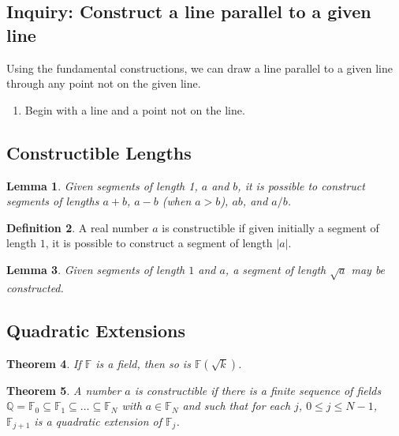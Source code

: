 \documentclass[11pt]{article}
\newenvironment{task}
	{\begin{mdframed}[linecolor=lightgray, linewidth=3pt]\raggedright}
	{\end{mdframed}}
\renewcommand\subset\subseteq
\newtheorem{theorem}{Theorem}[section]
\newtheorem{lemma}[theorem]{Lemma}
\theoremstyle{definition}
\newtheorem{definition}[theorem]{Definition}
\begin{document}
\subsection{Inquiry: Construct a line parallel to a given line}
\begin{task}
  Using the fundamental constructions, we can draw a line parallel to a given line through any point not on the given line.

  \begin{enumerate}
    \item Begin with a line and a point not on the line.
  \end{enumerate}
\end{task}

\subsection{Constructible Lengths}

\begin{lemma}
  Given segments of length 1, $a$ and $b$, it is possible to construct segments of lengths $a+b$, $a-b$ (when $a>b$), $ab$, and $a/b$.
  \label{lemma: rational constructions}
\end{lemma}

\begin{definition}
  A real number $a$ is constructible if given initially a segment of length $1$, it is possible to construct a segment of length $|a|$.
\end{definition}

\begin{lemma}
  Given segments of length $1$ and $a$, a segment of length $\sqrt{a}$ may be constructed.
  \label{lemma: sqrt can be constructed}
\end{lemma}

\subsection{Quadratic Extensions}

\begin{theorem}
  If $\mathbb{F}$ is a field, then so is $\mathbb{F}(\sqrt{k})$.
  \label{theorem: quadratic extensions of fields are fields}
\end{theorem}

\begin{theorem}
  A number $a$ is constructible if there is a finite sequence of fields $\mathbb{Q} = \mathbb{F}_0 \subset \mathbb{F}_1\subset \dots \subset \mathbb{F}_N$ with
  $a\in\mathbb{F}_N$ and such that for each $j$, $0\leq j \leq N-1$, $\mathbb{F}_{j+1}$ is a quadratic extension of $\mathbb{F}_j$.
  \label{theorem: constructible if in sequence of quadratic extensions}
\end{theorem}
\end{document}
